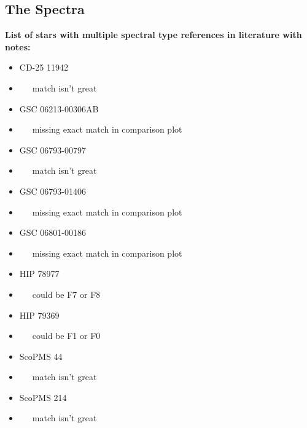 \subsection{The Spectra}

\iffalse
	{\bf List of stars with multiple spectral type references in literature with notes:}\\
	\begin{itemize}
		\item{} CD-25 11942
		\item{}~~~match isn't great

		\item{} GSC 06213-00306AB
		\item{}~~~missing exact match in comparison plot

		\item{} GSC 06793-00797
		\item{}~~~match isn't great

		\item{} GSC 06793-01406
		\item{}~~~missing exact match in comparison plot

		\item{} GSC 06801-00186
		\item{}~~~missing exact match in comparison plot

		\item{} HIP 78977
		\item{}~~~could be F7 or F8

		\item{} HIP 79369
		\item{}~~~could be F1 or F0

		\item{} ScoPMS 44
		\item{}~~~match isn't great

		\item{} ScoPMS 214
		\item{}~~~match isn't great
	\end{itemize}


